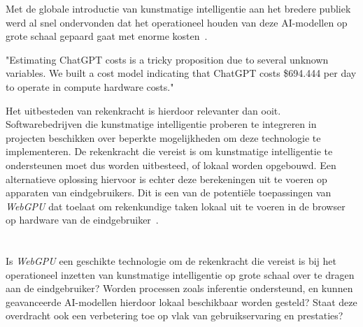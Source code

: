 Met de globale introductie van kunstmatige intelligentie aan het bredere publiek werd al snel ondervonden dat het operationeel houden van deze AI-modellen op grote schaal gepaard gaat met enorme kosten~\autocite{Patel2023}.

\begin{displayquote}
    "Estimating ChatGPT costs is a tricky proposition due to several unknown variables. We built a cost model indicating that ChatGPT costs \$694.444 per day to operate in compute hardware costs."
\end{displayquote}

Het uitbesteden van rekenkracht is hierdoor relevanter dan ooit. Softwarebedrijven die kunstmatige intelligentie proberen te integreren in projecten beschikken over beperkte mogelijkheden om deze technologie te implementeren. De rekenkracht die vereist is om kunstmatige intelligentie te ondersteunen moet dus worden uitbesteed, of lokaal worden opgebouwd. Een alternatieve oplossing hiervoor is echter deze berekeningen uit te voeren op apparaten van eindgebruikers. Dit is een van de potentiële toepassingen van \textit{WebGPU} dat toelaat om rekenkundige taken lokaal uit te voeren in de browser op hardware van de eindgebruiker~\autocite{Wallez2023}.

\bigbreak{}

\section{}%
\label{sec:onderzoeksvraag}


Is \textit{WebGPU} een geschikte technologie om de rekenkracht die vereist is bij het operationeel inzetten van kunstmatige intelligentie op grote schaal over te dragen aan de eindgebruiker? Worden processen zoals inferentie ondersteund, en kunnen geavanceerde AI-modellen hierdoor lokaal beschikbaar worden gesteld? Staat deze overdracht ook een verbetering toe op vlak van gebruikservaring en prestaties?


